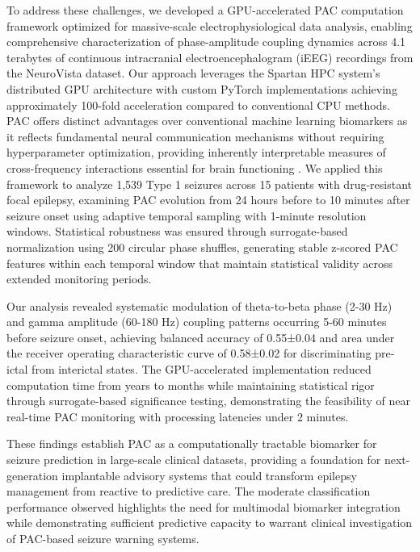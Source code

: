 	To address these challenges, we developed a GPU-accelerated PAC computation framework optimized for massive-scale electrophysiological data analysis, enabling comprehensive characterization of phase-amplitude coupling dynamics across 4.1 terabytes of continuous intracranial electroencephalogram (iEEG) recordings from the NeuroVista dataset. Our approach leverages the Spartan HPC system's distributed GPU architecture with custom PyTorch implementations achieving approximately 100-fold acceleration compared to conventional CPU methods. PAC offers distinct advantages over conventional machine learning biomarkers as it reflects fundamental neural communication mechanisms without requiring hyperparameter optimization, providing inherently interpretable measures of cross-frequency interactions essential for brain functioning . We applied this framework to analyze 1,539 Type 1 seizures across 15 patients with drug-resistant focal epilepsy, examining PAC evolution from 24 hours before to 10 minutes after seizure onset using adaptive temporal sampling with 1-minute resolution windows. Statistical robustness was ensured through surrogate-based normalization using 200 circular phase shuffles, generating stable z-scored PAC features within each temporal window that maintain statistical validity across extended monitoring periods. 

	Our analysis revealed systematic modulation of theta-to-beta phase (2-30 Hz) and gamma amplitude (60-180 Hz) coupling patterns occurring 5-60 minutes before seizure onset, achieving balanced accuracy of 0.55±0.04 and area under the receiver operating characteristic curve of 0.58±0.02 for discriminating pre-ictal from interictal states. The GPU-accelerated implementation reduced computation time from years to months while maintaining statistical rigor through surrogate-based significance testing, demonstrating the feasibility of near real-time PAC monitoring with processing latencies under 2 minutes. 

These findings establish PAC as a computationally tractable biomarker for seizure prediction in large-scale clinical datasets, providing a foundation for next-generation implantable advisory systems that could transform epilepsy management from reactive to predictive care. The moderate classification performance observed highlights the need for multimodal biomarker integration while demonstrating sufficient predictive capacity to warrant clinical investigation of PAC-based seizure warning systems. 

\label{sec:introduction}

